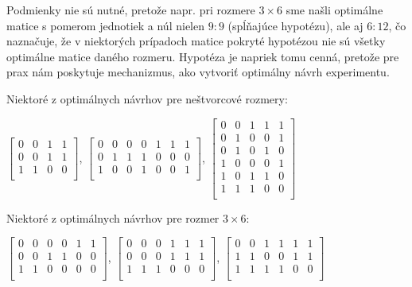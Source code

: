 \begin{com}
Podmienky nie sú nutné, pretože napr. pri rozmere $3 \times 6$ sme našli optimálne matice s pomerom jednotiek a núl
nielen $9:9$ (spĺňajúce hypotézu), ale aj $6:12$, čo naznačuje, 
že v niektorých prípadoch matice pokryté hypotézou nie sú všetky optimálne matice daného rozmeru. 
Hypotéza je napriek tomu cenná, pretože pre prax nám poskytuje mechanizmus, ako vytvoriť optimálny návrh experimentu.
\end{com}

Niektoré z optimálnych návrhov pre neštvorcové rozmery:

\begin{center}
$
\begin{bmatrix}
0 & 0 & 1 & 1 \\
0 & 0 & 1 & 1 \\
1 & 1 & 0 & 0 \\
\end{bmatrix}
$,
$
\begin{bmatrix}
0 & 0 & 0 & 0 & 1 & 1 & 1 \\
0 & 1 & 1 & 1 & 0 & 0 & 0 \\
1 & 0 & 0 & 1 & 0 & 0 & 1 \\
\end{bmatrix}
$,
$
\begin{bmatrix}
0 & 0 & 1 & 1 & 1 \\ 
0 & 1 & 0 & 0 & 1 \\ 
0 & 1 & 0 & 1 & 0 \\ 
1 & 0 & 0 & 0 & 1 \\ 
1 & 0 & 1 & 1 & 0 \\ 
1 & 1 & 1 & 0 & 0 \\ 
\end{bmatrix}
$
\end{center}

Niektoré z optimálnych návrhov pre rozmer $3 \times 6$:

\begin{center}
$
\begin{bmatrix}
0 & 0 & 0 & 0 & 1 & 1 \\
0 & 0 & 1 & 1 & 0 & 0 \\
1 & 1 & 0 & 0 & 0 & 0 \\
\end{bmatrix}
$,
$
\begin{bmatrix}
0 & 0 & 0 & 1 & 1 & 1 \\
0 & 0 & 0 & 1 & 1 & 1 \\
1 & 1 & 1 & 0 & 0 & 0 \\
\end{bmatrix}
$,
$
\begin{bmatrix}
0 & 0 & 1 & 1 & 1 & 1 \\
1 & 1 & 0 & 0 & 1 & 1 \\
1 & 1 & 1 & 1 & 0 & 0 \\
\end{bmatrix}
$
\end{center}

